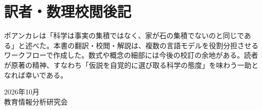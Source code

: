 \documentclass[a4paper,11pt,openany]{ltjsbook}
\begin{document}
\backmatter
\chapter{訳者・数理校閲後記}
ポアンカレは「科学は事実の集積ではなく、家が石の集積でないのと同じである」と述べた。本書の翻訳・校閲・解説は、複数の言語モデルを役割分担させるワークフローで作成した。数式や概念の細部には今後の校訂の余地がある。読者が原著の精神、すなわち「仮説を自覚的に選び取る科学の態度」を味わう一助となれば幸いである。

\begin{flushright}2026年10月\\教育情報分析研究会\end{flushright}
\end{document}

